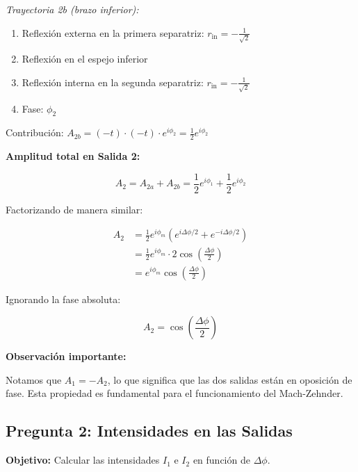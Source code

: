 \documentclass[12pt,a4paper]{article}
\begin{document}
\textit{Trayectoria 2b (brazo inferior):}
\begin{enumerate}
    \item Reflexión externa en la primera separatriz: $r_{\text{in}} = -\frac{1}{\sqrt{2}}$
    \item Reflexión en el espejo inferior
    \item Reflexión interna en la segunda separatriz: $r_{\text{in}} = -\frac{1}{\sqrt{2}}$
    \item Fase: $\phi_2$
\end{enumerate}

Contribución: $A_{2b} = (-t) \cdot (-t) \cdot e^{i\phi_2} = \frac{1}{2} e^{i\phi_2}$

\textbf{Amplitud total en Salida 2:}

\begin{equation}
    A_2 = A_{2a} + A_{2b} = \frac{1}{2} e^{i\phi_1} + \frac{1}{2} e^{i\phi_2}
\end{equation}

Factorizando de manera similar:

\begin{align}
    A_2 &= \frac{1}{2} e^{i\phi_m} \left( e^{i\Delta\phi/2} + e^{-i\Delta\phi/2} \right) \\
    &= \frac{1}{2} e^{i\phi_m} \cdot 2\cos\left(\frac{\Delta\phi}{2}\right) \\
    &= e^{i\phi_m} \cos\left(\frac{\Delta\phi}{2}\right)
\end{align}

Ignorando la fase absoluta:

\begin{equation}
    \boxed{A_2 = \cos\left(\frac{\Delta\phi}{2}\right)}
\end{equation}

\textbf{Observación importante:}

Notamos que $A_1 = -A_2$, lo que significa que las dos salidas están en oposición de fase. Esta propiedad es fundamental para el funcionamiento del Mach-Zehnder.

\subsection{Pregunta 2: Intensidades en las Salidas}

\textbf{Objetivo:} Calcular las intensidades $I_1$ e $I_2$ en función de $\Delta\phi$.
\end{document}
